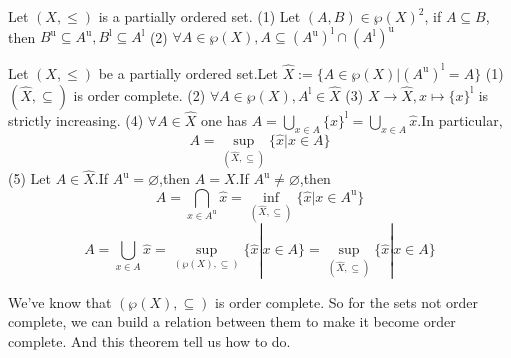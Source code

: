 \documentclass{book}
\numberwithin{equation}{section}
\begin{document}
\begin{lemmaenv}
    Let $(X,\le)$ is a partially ordered set.
    \newline
    (1) Let $(A,B)\in \wp(X)^2$, if $A\subseteq B$, then $B^\mathrm{u}\subseteq A^\mathrm{u},B^\mathrm{l}\subseteq A^\mathrm{l}$
    \newline
    (2) $\forall A\in \wp(X),A\subseteq (A^\mathrm{u})^\mathrm{l}\cap (A^\mathrm{l})^\mathrm{u}$
\end{lemmaenv}

\begin{theoremenv}
    \quad
    \newline
    Let $(X,\le )$ be a partially ordered set.Let $\hat{X}:=\{A\in \wp (X)|(A^\mathrm{u})^\mathrm{l}=A\}$
\newline
(1) $(\hat{X},\subseteq)$ is order complete.
\newline
(2) $\forall A\in \wp(X),A^\mathrm{l}\in \hat{X}$
\newline
(3) $X\rightarrow \hat{X},x\mapsto \{x\}^\mathrm{l}$ is strictly increasing.
\newline
(4) $\forall A\in \hat{X}$ one has $A=\bigcup_{x\in A}\{x\}^\mathrm{l}=\bigcup_{x\in A}\hat{x}$.In particular, 
$$A=\sup_{(\hat{X},\subseteq)}\{\hat{x}|x\in A\}$$
(5) Let $A\in \hat{X}$.If $A^\mathrm{u}=\varnothing$,then $A=X$.If $A^\mathrm{u}\not=\varnothing$,then 
$$A=\bigcap_{x\in A^\mathrm{u}}\hat{x}=\inf_{(\hat{X},\subseteq)}\{\hat{x}|x\in A^\mathrm{u}\}$$
$$A=\bigcup_{x\in A}\hat{x}=\sup_{(\wp(X),\subseteq)}\{\hat{x}|x\in A\}=\sup_{(\hat{X},\subseteq)}\{\hat{x}|x\in A\}$$
\end{theoremenv}
\begin{remark}
    We've know that $(\wp(X),\subseteq)$ is order complete. So for the sets not order complete, we can build a relation between them to make it become order complete. And this theorem tell us how to do.
\end{remark}
\end{document}
